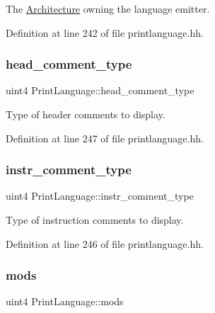 The \mbox{\hyperlink{class_architecture}{Architecture}} owning the language emitter. 



Definition at line 242 of file printlanguage.\+hh.

\mbox{\label{class_print_language_ad1857510f16a26544c2c8a23b9a86a22}} 
\subsubsection{\texorpdfstring{head\_comment\_type}{head\_comment\_type}}
{\footnotesize\ttfamily uint4 Print\+Language\+::head\+\_\+comment\+\_\+type\hspace{0.3cm}{\ttfamily [protected]}}



Type of header comments to display. 



Definition at line 247 of file printlanguage.\+hh.

\mbox{\label{class_print_language_a4bb9049299d4bf3932bb5422a1706a66}} 
\subsubsection{\texorpdfstring{instr\_comment\_type}{instr\_comment\_type}}
{\footnotesize\ttfamily uint4 Print\+Language\+::instr\+\_\+comment\+\_\+type\hspace{0.3cm}{\ttfamily [protected]}}



Type of instruction comments to display. 



Definition at line 246 of file printlanguage.\+hh.

\mbox{\label{class_print_language_a9c87a425ce241ce1b47ca8305de2fdc0}} 
\subsubsection{\texorpdfstring{mods}{mods}}
{\footnotesize\ttfamily uint4 Print\+Language\+::mods\hspace{0.3cm}{\ttfamily [protected]}}



